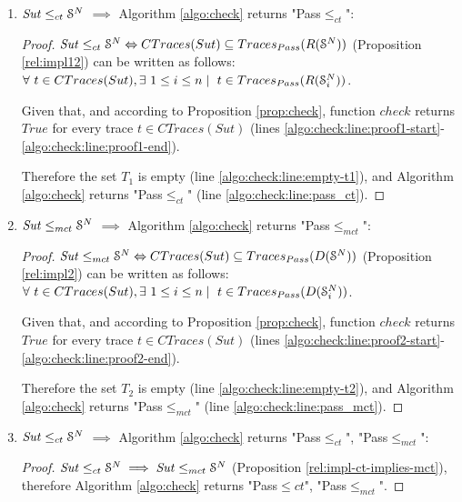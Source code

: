 \begin{enumerate}
    \item $\mathit{Sut} \leq_{ct} \EuScript{S}^N$ $\implies$
        Algorithm \ref{algo:check} returns "Pass$\leq_{ct}$":

        \begin{proof}
            $\mathit{Sut} \leq_{ct} \EuScript{S}^{N}
            \Leftrightarrow CTraces(Sut) \subseteq Traces_{Pass}(R(\EuScript{S}^N))$
            (Proposition \ref{rel:impl12}) can be written as
            follows: $\forall ~t \in CTraces(Sut), \exists ~1
            \leq i \leq n \mid ~t \in Traces_{Pass}(R(\EuScript{S}_i^{N}))$.

            Given that, and according to Proposition
            \ref{prop:check}, function $check$ returns $True$ for
            every trace $t \in CTraces(Sut)$ (lines
            \ref{algo:check:line:proof1-start}-\ref{algo:check:line:proof1-end}).

            Therefore the set $T_1$ is empty (line
            \ref{algo:check:line:empty-t1}), and Algorithm
            \ref{algo:check} returns "Pass$\leq_{ct}$" (line
            \ref{algo:check:line:pass_ct}).
        \end{proof}

    \item $\mathit{Sut} \leq_{mct} \EuScript{S}^N$ $\implies$
        Algorithm \ref{algo:check} returns "Pass$\leq_{mct}$":

        \begin{proof}
            $\mathit{Sut} \leq_{mct} \EuScript{S}^{N}
            \Leftrightarrow CTraces(Sut) \subseteq Traces_{Pass}(D(\EuScript{S}^N))$
            (Proposition \ref{rel:impl2}) can be written as
            follows: $\forall ~t \in CTraces(Sut), \exists ~1
            \leq i \leq n \mid ~t \in Traces_{Pass}(D(\EuScript{S}_i^{N}))$.

            Given that, and according to Proposition
            \ref{prop:check}, function $check$ returns $True$ for
            every trace $t \in CTraces(Sut)$ (lines
            \ref{algo:check:line:proof2-start}-\ref{algo:check:line:proof2-end}).

            Therefore the set $T_2$ is empty
            (line \ref{algo:check:line:empty-t2}), and Algorithm
            \ref{algo:check} returns "Pass$\leq_{mct}$" (line
            \ref{algo:check:line:pass_mct}).
        \end{proof}

    \item $\mathit{Sut} \leq_{ct} \EuScript{S}^N$ $\implies$
        Algorithm \ref{algo:check} returns "Pass$\leq_{ct}$",
        "Pass$\leq_{mct}$":

        \begin{proof}
            $\mathit{Sut} \leq_{ct} \EuScript{S}^{N} \implies
            \mathit{Sut} \leq_{mct} \EuScript{S}^{N}$
            (Proposition \ref{rel:impl-ct-implies-mct}), therefore
            Algorithm \ref{algo:check} returns "Pass$\leq{ct}$",
            "Pass$\leq_{mct}$".
        \end{proof}
\end{enumerate}

